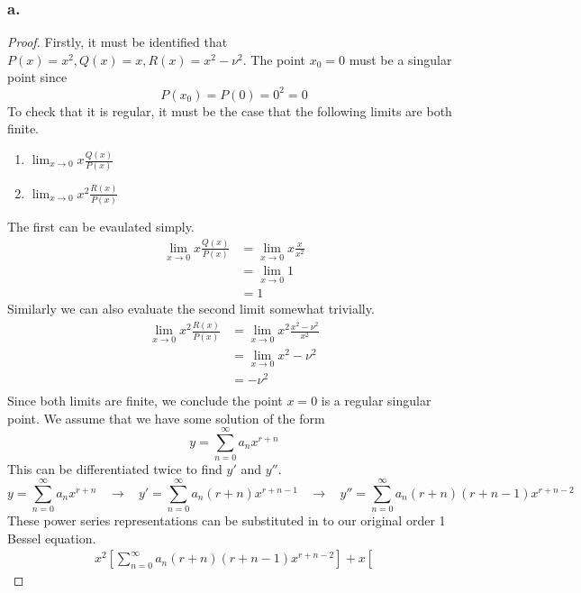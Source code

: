 \documentclass{article}
\theoremstyle{definition}
\begin{document}
    \subsubsection*{a.}
    \begin{proof}
        Firstly, it must be identified that $P(x) = x^2, Q(x) = x, R(x) = x^2 - \nu^2$.
        The point $x_0 = 0$ must be a singular point since
        \[
            P(x_0) = P(0) = 0^2 = 0
        \]
        To check that it is regular, it must be the case that the following limits are both finite.
        \begin{enumerate}
            \item $\lim_{x\to 0}x\frac{Q(x)}{P(x)}$\\
            \item $\lim_{x\to 0}x^2 \frac{R(x)}{P(x)}$
        \end{enumerate}
        The first can be evaulated simply.
        \begin{align*}
            \lim_{x\to 0} x\frac{Q(x)}{P(x)} &= \lim_{x\to 0}x \frac{x}{x^2} \\
            &= \lim_{x\to 0} 1 \\
            &= 1
        \end{align*}
        Similarly we can also evaluate the second limit somewhat trivially.
        \begin{align*}
            \lim_{x\to 0} x^2 \frac{R(x)}{P(x)} &= \lim_{x\to 0}x^2 \frac{x^2 - \nu^2}{x^2} \\
            &= \lim_{x\to 0}x^2 - \nu^2\\
            &= -\nu^2 \\
        \end{align*}
            Since both limits are finite, we conclude the point $x = 0$ is a regular singular point.
        We assume that we have some solution of the form
        \[
        y = \sum_{n=0}^\infty a_n x^{r+n}
        \] 
        This can be differentiated twice to find $y'$ and $y''$.                
                \[
                y = \sum_{n=0}^\infty a_n x^{r+n} \ \ \ \ \longrightarrow \ \ \ \ y' = \sum_{n=0}^{\infty} a_n (r+n) x^{r+n-1} \ \ \ \ \longrightarrow \ \ \ \ y'' = \sum_{n=0}^{\infty} a_n (r+n) (r + n - 1) x^{r + n - 2} 
            \] 
        These power series representations can be substituted in to our original order 1 Bessel equation.
        \begin{align*}
                x^2 \left[
                    \sum_{n=0}^{\infty} a_n (r+n) (r + n - 1) x^{r + n - 2}
                \right] + x \left[

\end{align*}
\end{proof}
\end{document}
